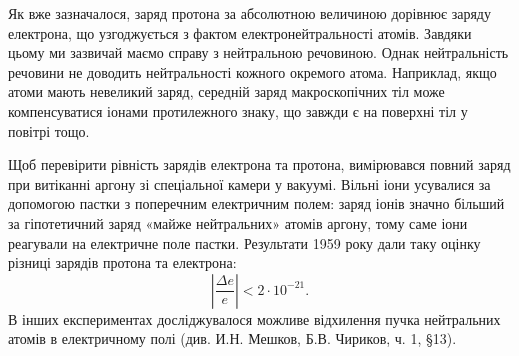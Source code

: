 \documentclass[14pt]{extarticle}
\begin{document}
Як вже зазначалося, заряд протона за абсолютною величиною дорівнює заряду електрона, що узгоджується з фактом електронейтральності атомів. Завдяки цьому
ми зазвичай маємо справу з нейтральною речовиною. Однак нейтральність речовини не доводить нейтральності кожного окремого атома. Наприклад, якщо атоми
мають невеликий заряд, середній заряд макроскопічних тіл може компенсуватися іонами протилежного знаку, що завжди є на поверхні тіл у повітрі тощо.

Щоб перевірити рівність зарядів електрона та протона, вимірювався повний заряд при витіканні аргону зі спеціальної камери у вакуумі. Вільні іони
усувалися за допомогою пастки з поперечним електричним полем: заряд іонів значно більший за гіпотетичний заряд «майже нейтральних» атомів аргону, тому
саме іони реагували на електричне поле пастки. Результати 1959 року дали таку оцінку різниці зарядів протона та електрона:
\[
\left| \frac{\Delta e}{e} \right| < 2 \cdot 10^{-21}.
\]
В інших експериментах досліджувалося можливе відхилення пучка нейтральних атомів в електричному полі (див. И.Н. Мешков, Б.В. Чириков, ч. 1, §13).
\end{document}

